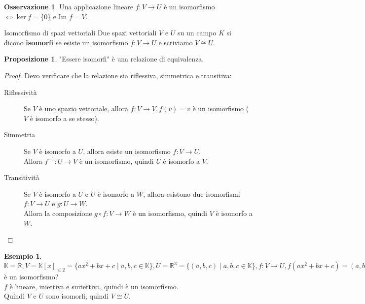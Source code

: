 \documentclass[a4paper]{article}
\theoremstyle{definition}
\newtheorem*{oss}{Osservazione}
\newtheorem*{es}{Esempio}
\newtheorem*{prop}{Proposizione}
\begin{document}
\begin{oss}
	Una applicazione lineare $f: V \rightarrow U$ è un isomorfismo $\Leftrightarrow \ker f = \{0\}$ e Im $f = V$.
\end{oss}

\begin{deff}{Isomorfismo di spazi vettoriali}{}
	Due spazi vettoriali $V$ e $U$ su un campo $K$ si dicono \textbf{isomorfi} se esiste un isomorfismo $f: V \rightarrow U$ e scriviamo $V \cong U$.
\end{deff}
\begin{prop}
	"Essere isomorfi" è una relazione di equivalenza.
\end{prop}
\begin{proof}
	Devo verificare che la relazione sia riflessiva, simmetrica e transitiva:
	\begin{description}
		\item[Riflessività] Se $V$ è uno spazio vettoriale, allora $f: V \rightarrow V, f(v) = v$ è un isomorfismo ($V$ è isomorfo a se stesso).
		\item[Simmetria] Se $V$ è isomorfo a $U$, allora esiste un isomorfismo $f: V \rightarrow U$. \\
		      Allora $f^{-1}: U \rightarrow V$ è un isomorfismo, quindi $U$ è isomorfo a $V$.
		\item[Transitività] Se $V$ è isomorfo a $U$ e $U$ è isomorfo a $W$, allora esistono due isomorfismi $f: V \rightarrow U$ e $g: U \rightarrow W$. \\
		      Allora la composizione $g \circ f: V \rightarrow W$ è un isomorfismo, quindi $V$ è isomorfo a $W$.
	\end{description}
\end{proof}

\begin{es}
	$\mathbb{K} = \mathbb{R}, V = \mathbb{K}[x]_{\le 2} = \{ax^2 + bx + c \mid a, b, c \in \mathbb{K}\}, U = \mathbb{R}^3 = \{(a, b, c) \mid a, b, c \in \mathbb{K}\}, f: V \rightarrow U, f(ax^2 + bx + c) = (a, b, c)$ è un isomorfismo? \\
	$f$ è lineare, iniettiva e suriettiva, quindi è un isomorfismo. \\
	Quindi $V$ e $U$ sono isomorfi, quindi $V \cong U$.
\end{es}
\end{document}

